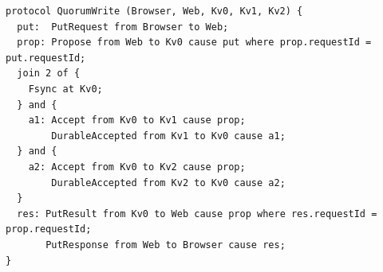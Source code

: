 \begin{Verbatim}[fontsize=\small]
protocol QuorumWrite (Browser, Web, Kv0, Kv1, Kv2) {
  put:  PutRequest from Browser to Web;
  prop: Propose from Web to Kv0 cause put where prop.requestId = put.requestId;
  join 2 of {
    Fsync at Kv0;
  } and {
    a1: Accept from Kv0 to Kv1 cause prop;
        DurableAccepted from Kv1 to Kv0 cause a1;
  } and {
    a2: Accept from Kv0 to Kv2 cause prop;
        DurableAccepted from Kv2 to Kv0 cause a2;
  }
  res: PutResult from Kv0 to Web cause prop where res.requestId = prop.requestId;
       PutResponse from Web to Browser cause res;
}
\end{Verbatim}
